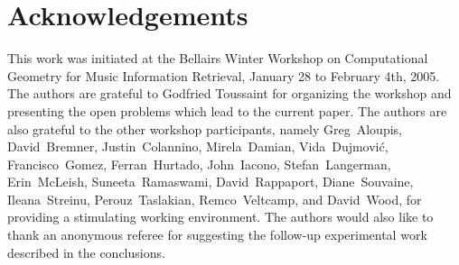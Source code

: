 \documentclass[11pt]{patmorin}
\begin{document}
\section*{Acknowledgements}

This work was initiated at the Bellairs Winter Workshop on
Computational Geometry for Music Information Retrieval, January 28 to
February 4th, 2005.  The authors are grateful to Godfried Toussaint
for organizing the workshop and presenting the open problems which
lead to the current paper.  The authors are also grateful to the other
workshop participants, namely 
Greg~Aloupis,
David~Bremner,
Justin~Colannino,
Mirela~Damian, 
Vida~Dujmovi\'c,
Francisco~Gomez,
Ferran~Hurtado, 
John~Iacono,
Stefan~Langerman,
Erin~McLeish,
Suneeta~Ramaswami,
David~Rappaport,
Diane~Souvaine,
Ileana~Streinu,
Perouz~Taslakian,
Remco~Veltcamp,
and David~Wood,
for providing a
stimulating working environment.  The authors would also like to thank
an anonymous referee for suggesting the follow-up experimental work
described in the conclusions.



\end{document}
